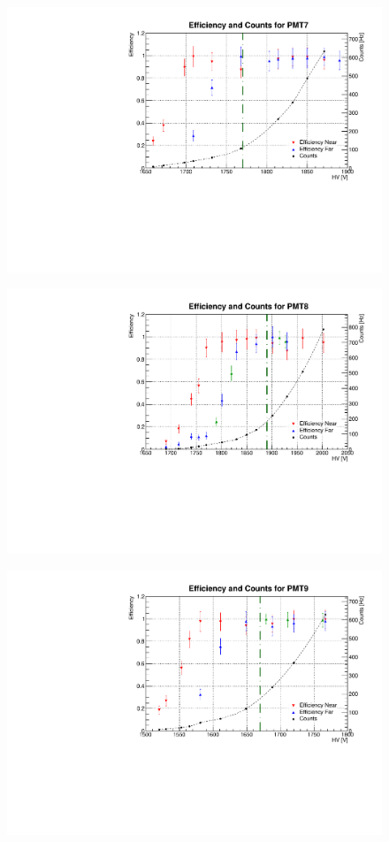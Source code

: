 \begin{figure}[h]
	\centerline{\includegraphics[scale=0.7]{img/eff7.pdf}}
\end{figure}
\begin{figure}[h]
	\centerline{\includegraphics[scale=0.7]{img/eff8.pdf}}
\end{figure}
\begin{figure}[h]
	\centerline{\includegraphics[scale=0.7]{img/eff9.pdf}}
\end{figure}
